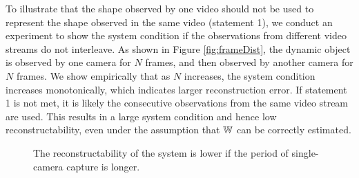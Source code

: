 To illustrate that the shape observed by one video should not be used to represent the shape observed in the same video (statement 1), we conduct an experiment to show the system condition if the observations from different video streams do not interleave. As shown in Figure \ref{fig:frameDist}, the dynamic object is observed by one camera for $N$ frames, and then observed by another camera for $N$ frames. We show empirically that as $N$ increases, the system condition increases monotonically, which indicates larger reconstruction error. If statement 1 is not met, it is likely the consecutive observations from the same video stream are used. This results in a large system condition and hence low reconstructability, even under the assumption that $\mathbb W$ can be correctly estimated.

\begin{figure}
\centering
{}
\caption[System condition given different number of consecutive captures from one camera.]{The reconstructability of the system is lower if the period of single-camera capture is longer.}
\end{figure}

